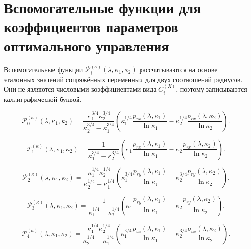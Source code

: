 \section*{Вспомогательные функции для коэффициентов параметров оптимального управления}

\noindent
Вспомогательные функции \(\mathcal P_i^{(\kappa)}(\lambda,\kappa_1,\kappa_2)\) рассчитываются на основе эталонных значений сопряжённых переменных для двух соотношений радиусов. Они не являются числовыми коэффициентами вида \(C_i^{(X)}\), поэтому записываются каллиграфической буквой.

\begin{equation}
	\mathcal P_0^{(\kappa)}(\lambda,\kappa_1,\kappa_2)=
	\frac{\kappa_1^{3/4}\kappa_2^{3/4}}{\kappa_2^{3/4}-\kappa_1^{3/4}}
	\left(
	\kappa_1^{1/4}\frac{p_{rx}(\lambda,\kappa_1)}{\ln\kappa_1}-
	\kappa_2^{1/4}\frac{p_{rx}(\lambda,\kappa_2)}{\ln\kappa_2}
	\right).
	\label{eq:appendixC_P0_kappa}
\end{equation}

\begin{equation}
	\mathcal P_1^{(\kappa)}(\lambda,\kappa_1,\kappa_2)=
	\frac{1}{\kappa_1^{3/4}-\kappa_2^{3/4}}
	\left(
	\kappa_1\frac{p_{rx}(\lambda,\kappa_1)}{\ln\kappa_1}-
	\kappa_2\frac{p_{rx}(\lambda,\kappa_2)}{\ln\kappa_2}
	\right).
	\label{eq:appendixC_P1_kappa}
\end{equation}

\begin{equation}
	\mathcal P_2^{(\kappa)}(\lambda,\kappa_1,\kappa_2)=
	\frac{\kappa_1^{1/4}\kappa_2^{1/4}}{\kappa_2^{1/4}-\kappa_1^{1/4}}
	\left(
	\kappa_1^{3/4}\frac{p_{ry}(\lambda,\kappa_1)}{\ln\kappa_1}-
	\kappa_2^{3/4}\frac{p_{ry}(\lambda,\kappa_2)}{\ln\kappa_2}
	\right).
	\label{eq:appendixC_P2_kappa}
\end{equation}

\begin{equation}
	\mathcal P_3^{(\kappa)}(\lambda,\kappa_1,\kappa_2)=
	\frac{1}{\kappa_1^{1/4}-\kappa_2^{1/4}}
	\left(
	\kappa_1\frac{p_{ry}(\lambda,\kappa_1)}{\ln\kappa_1}-
	\kappa_2\frac{p_{ry}(\lambda,\kappa_2)}{\ln\kappa_2}
	\right).
	\label{eq:appendixC_P3_kappa}
\end{equation}

\begin{equation}
	\mathcal P_4^{(\kappa)}(\lambda,\kappa_1,\kappa_2)=
	\frac{\kappa_1^{1/4}\kappa_2^{1/4}}{\kappa_2^{1/4}-\kappa_1^{1/4}}
	\left(
	\kappa_1^{3/4}\frac{p_{vx}(\lambda,\kappa_1)}{\ln\kappa_1}-
	\kappa_2^{3/4}\frac{p_{vx}(\lambda,\kappa_2)}{\ln\kappa_2}
	\right).
	\label{eq:appendixC_P4_kappa}
\end{equation}

